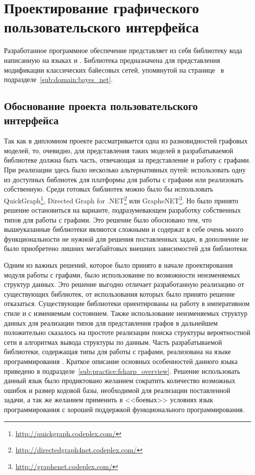 
\section{Проектирование графического пользовательского интерфейса} %
\label{sec:gui_design}

Разработанное программное обеспечение представляет из себя библиотеку кода написанную на языках \fsharp{} и \csharp{}.
Библиотека предназначена для представления модификации классических байесовых сетей, упомянутой на странице~\pageref{page:domain:bayes_mod} в подразделе~\ref{sub:domain:bayes_net}.

\subsection{Обоснование проекта пользовательского интерфейса}
\label{sub:gui_design:motivation}

Так как в дипломном проекте рассматривается одна из разновидностей графовых моделей, то, очевидно, для представления таких моделей в разрабатываемой библиотеке должна быть часть, отвечающая за представление и работу с графами.
При реализации здесь было несколько альтернативных путей: использовать одну из доступных библиотек для платформы \dotnet{} для работы с графами или реализовать собственную.
Среди готовых библиотек можно было бы использовать QuickGraph\footnote{\url{http://quickgraph.codeplex.com/}}, Directed Graph for .NET\footnote{\url{http://directedgraph4net.codeplex.com/}} или GrapheNET\footnote{\url{http://graphenet.codeplex.com/}}.
Но было принято решение остановиться на варианте, подразумевающем разработку собственных типов для работы с графами.
Это решение было обосновано тем, что вышеуказанные библиотеки являются сложными и содержат в себе очень много функциональности не нужной для решения поставленных задач, в дополнение не было приобретено лишних мегабайтовых внешних зависимостей для библиотеки.

Одним из важных решений, которое было принято в начале проектирования модуля работы с графами, было использование по возможности неизменяемых структур данных.
Это решение выгодно отличает разработанную реализацию от существующих библиотек, от использования которых было принято решение отказаться. 
Существующие библиотеки ориентированы на работу в императивном стиле и с изменяемым состоянием.
Также использование неизменяемых структур данных для реализации типов для представления графов в дальнейшем положительно сказалось на простоте реализации поиска структуры вероятностной сети в алгоритмах вывода структуры по данным.
Часть разрабатываемой библиотеки, содержащая типы для работы с графами, реализована на языке программирования \fsharp{}.
Краткое описание основных особенностей данного языка приведено в подразделе~\ref{sub:practice:fsharp_overview}.
Решение использовать данный язык было продиктовано желанием сократить количество возможных ошибок и размер кодовой базы, необходимой для реализации поставленной задачи, а так же желанием применить в <<боевых>> условиях язык программирования с хорошей поддержкой функционального программирования.

